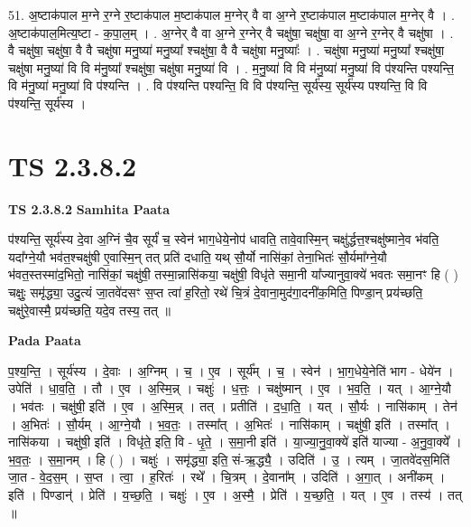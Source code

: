 \documentclass[17pt]{extarticle}
\begin{document}
51. अ॒ष्टाक॑पाल म॒ग्ने र॒ग्ने र॒ष्टाक॑पाल म॒ष्टाक॑पाल म॒ग्नेर् वै वा अ॒ग्ने र॒ष्टाक॑पाल म॒ष्टाक॑पाल म॒ग्नेर् वै । . अ॒ष्टाक॑पाल॒मित्य॒ष्टा - क॒पा॒ल॒म् । . अ॒ग्नेर् वै वा अ॒ग्ने र॒ग्नेर् वै चक्षु॑षा॒ चक्षु॑षा॒ वा अ॒ग्ने र॒ग्नेर् वै चक्षु॑षा । . वै चक्षु॑षा॒ चक्षु॑षा॒ वै वै चक्षु॑षा मनु॒ष्या॑ मनु॒ष्या᳚ श्चक्षु॑षा॒ वै वै चक्षु॑षा मनु॒ष्याः᳚ । . चक्षु॑षा मनु॒ष्या॑ मनु॒ष्या᳚ श्चक्षु॑षा॒ चक्षु॑षा मनु॒ष्या॑ वि वि म॑नु॒ष्या᳚ श्चक्षु॑षा॒ चक्षु॑षा मनु॒ष्या॑ वि । . म॒नु॒ष्या॑ वि वि म॑नु॒ष्या॑ मनु॒ष्या॑ वि प॑श्यन्ति पश्यन्ति॒ वि म॑नु॒ष्या॑ मनु॒ष्या॑ वि प॑श्यन्ति । . वि प॑श्यन्ति पश्यन्ति॒ वि वि प॑श्यन्ति॒ सूर्य॑स्य॒ सूर्य॑स्य पश्यन्ति॒ वि वि प॑श्यन्ति॒ सूर्य॑स्य । \newline
\pagebreak
{}
\section*{ TS 2.3.8.2 }

\textbf{TS 2.3.8.2 } \newline
\textbf{Samhita Paata} \newline

प॑श्यन्ति॒ सूर्य॑स्य दे॒वा अ॒ग्निं चै॒व सूर्यं॑ च॒ स्वेन॑ भाग॒धेये॒नोप॑ धावति॒ तावे॒वास्मि॒न् चक्षु॑र्द्धत्त॒श्चक्षु॑ष्माने॒व भ॑वति॒ यदा᳚ग्ने॒यौ भव॑त॒श्चक्षु॑षी ए॒वास्मि॒न् तत् प्रति॑ दधाति॒ यथ् सौ॒र्यो नासि॑कां॒ तेना॒भितः॑ सौ॒र्यमा᳚ग्ने॒यौ भ॑वत॒स्तस्मा॑द॒भितो॒ नासि॑कां॒ चक्षु॑षी॒ तस्मा॒न्नासि॑कया॒ चक्षु॑षी॒ विधृ॑ते समा॒नी या᳚ज्यानुवा॒क्ये॑ भवतः समा॒नꣳ हि ( ) चक्षुः॒ समृ॑द्ध्या॒ उदु॒त्यं जा॒तवे॑दसꣳ स॒प्त त्वा॑ ह॒रितो॒ रथे॑ चि॒त्रं दे॒वाना॒मुद॑गा॒दनी॑क॒मिति॒ पिण्डा॒न् प्रय॑च्छति॒ चक्षु॑रे॒वास्मै॒ प्रय॑च्छति॒ यदे॒व तस्य॒ तत् ॥ \newline

\textbf{Pada Paata} \newline

प॒श्य॒न्ति॒ । सूर्य॑स्य । दे॒वाः । अ॒ग्निम् । च॒ । ए॒व । सूर्य᳚म् । च॒ । स्वेन॑ । भा॒ग॒धेये॒नेति॑ भाग - धेये॑न । उपेति॑ । धा॒व॒ति॒ । तौ । ए॒व । अ॒स्मि॒न्न् । चक्षुः॑ । ध॒त्तः॒ । चक्षु॑ष्मान् । ए॒व । भ॒व॒ति॒ । यत् । आ॒ग्ने॒यौ । भव॑तः । चक्षु॑षी॒ इति॑ । ए॒व । अ॒स्मि॒न्न् । तत् । प्रतीति॑ । द॒धा॒ति॒ । यत् । सौ॒र्यः । नासि॑काम् । तेन॑ । अ॒भितः॑ । सौ॒र्यम् । आ॒ग्ने॒यौ । भ॒व॒तः॒ । तस्मा᳚त् । अ॒भितः॑ । नासि॑काम् । चक्षु॑षी॒ इति॑ । तस्मा᳚त् । नासि॑कया । चक्षु॑षी॒ इति॑ । विधृ॑ते॒ इति॒ वि - धृ॒ते॒ । स॒मा॒नी इति॑ । या॒ज्या॒नु॒वा॒क्ये॑ इति॑ याज्या - अ॒नु॒वा॒क्ये᳚ । भ॒व॒तः॒ । स॒मा॒नम् । हि ( ) । चक्षुः॑ । समृ॑द्ध्या॒ इति॒ सं-ऋ॒द्ध्यै॒ । उदिति॑ ।   उ॒ । त्यम् । जा॒तवे॑दस॒मिति॑ जा॒त - वे॒द॒स॒म् । स॒प्त । त्वा॒ । ह॒रितः॑ । रथे᳚ । चि॒त्रम् । दे॒वाना᳚म् । उदिति॑ । अ॒गा॒त् । अनी॑कम् । इति॑ । पिण्डान्॑ । प्रेति॑ । य॒च्छ॒ति॒ । चक्षुः॑ । ए॒व । अ॒स्मै॒ । प्रेति॑ । य॒च्छ॒ति॒ । यत् । ए॒व । तस्य॑ । तत् ॥  \newline
\end{document}
